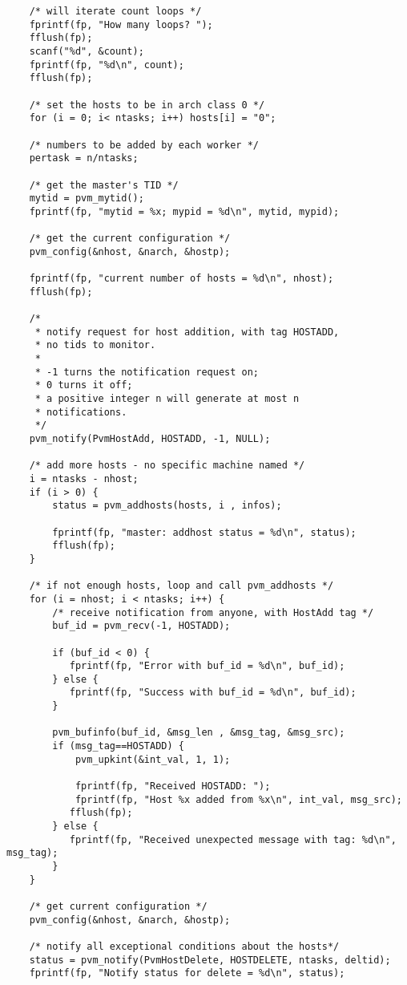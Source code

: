 \begin{verbatim}
    /* will iterate count loops */
    fprintf(fp, "How many loops? ");
    fflush(fp);
    scanf("%d", &count);
    fprintf(fp, "%d\n", count);
    fflush(fp);

    /* set the hosts to be in arch class 0 */
    for (i = 0; i< ntasks; i++) hosts[i] = "0";

    /* numbers to be added by each worker */
    pertask = n/ntasks;

    /* get the master's TID */
    mytid = pvm_mytid();
    fprintf(fp, "mytid = %x; mypid = %d\n", mytid, mypid);

    /* get the current configuration */
    pvm_config(&nhost, &narch, &hostp);

    fprintf(fp, "current number of hosts = %d\n", nhost);
    fflush(fp);

    /* 
     * notify request for host addition, with tag HOSTADD, 
     * no tids to monitor.  
     *
     * -1 turns the notification request on;
     * 0 turns it off;
     * a positive integer n will generate at most n 
     * notifications.
     */     
    pvm_notify(PvmHostAdd, HOSTADD, -1, NULL);

    /* add more hosts - no specific machine named */
    i = ntasks - nhost;
    if (i > 0) {
        status = pvm_addhosts(hosts, i , infos);
      
        fprintf(fp, "master: addhost status = %d\n", status);
        fflush(fp);
    }
     
    /* if not enough hosts, loop and call pvm_addhosts */
    for (i = nhost; i < ntasks; i++) {
        /* receive notification from anyone, with HostAdd tag */
        buf_id = pvm_recv(-1, HOSTADD);

        if (buf_id < 0) {
           fprintf(fp, "Error with buf_id = %d\n", buf_id);
        } else {
           fprintf(fp, "Success with buf_id = %d\n", buf_id);
        }

        pvm_bufinfo(buf_id, &msg_len , &msg_tag, &msg_src);
        if (msg_tag==HOSTADD) {
            pvm_upkint(&int_val, 1, 1);

            fprintf(fp, "Received HOSTADD: ");
            fprintf(fp, "Host %x added from %x\n", int_val, msg_src);
           fflush(fp);
        } else {
           fprintf(fp, "Received unexpected message with tag: %d\n", msg_tag);
        }
    }

    /* get current configuration */
    pvm_config(&nhost, &narch, &hostp);

    /* notify all exceptional conditions about the hosts*/
    status = pvm_notify(PvmHostDelete, HOSTDELETE, ntasks, deltid);
    fprintf(fp, "Notify status for delete = %d\n", status);
     

\end{verbatim}
